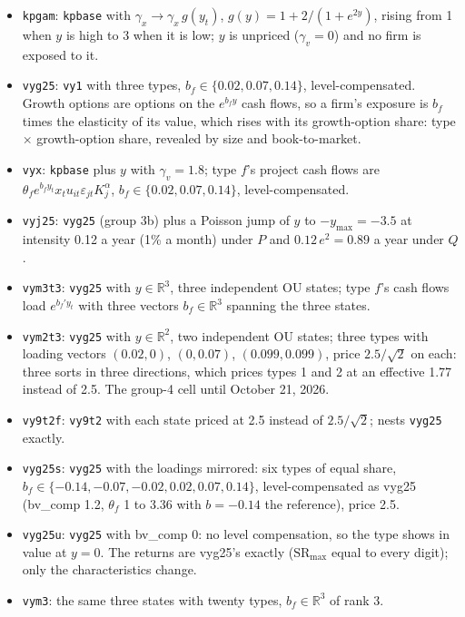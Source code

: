 \begin{itemize}
\item \texttt{kpgam}: \texttt{kpbase} with $\gamma_x\to\gamma_x\,g(y_t)$, $g(y)=1+2/(1+e^{2y})$, rising from 1 when $y$ is high to 3 when it is low; $y$ is unpriced ($\gamma_v=0$) and no firm is exposed to it.
\item \texttt{vyg25}: \texttt{vy1} with three types, $b_f\in\{0.02,0.07,0.14\}$, level-compensated. Growth options are options on the $e^{b_f y}$ cash flows, so a firm's exposure is $b_f$ times the elasticity of its value, which rises with its growth-option share: type $\times$ growth-option share, revealed by size and book-to-market.
\item \texttt{vyx}: \texttt{kpbase} plus $y$ with $\gamma_v=1.8$; type $f$'s project cash flows are $\theta_f e^{b_f y_t}x_t u_{it}\varepsilon_{jt}K_j^\alpha$, $b_f\in\{0.02,0.07,0.14\}$, level-compensated.
\item \texttt{vyj25}: \texttt{vyg25} (group 3b) plus a Poisson jump of $y$ to $-y_{\max}=-3.5$ at intensity 0.12 a year (1\% a month) under $P$ and $0.12\,e^{2}=0.89$ a year under $Q$.
\item \texttt{vym3t3}: \texttt{vyg25} with $y\in\mathbb{R}^3$, three independent OU states; type $f$'s cash flows load $e^{b_f'y_t}$ with three vectors $b_f\in\mathbb{R}^3$ spanning the three states.
\item \texttt{vym2t3}: \texttt{vyg25} with $y\in\mathbb{R}^2$, two independent OU states; three types with loading vectors $(0.02,0)$, $(0,0.07)$, $(0.099,0.099)$, price $2.5/\sqrt2$ on each: three sorts in three directions, which prices types 1 and 2 at an effective 1.77 instead of 2.5. The group-4 cell until October 21, 2026.
\item \texttt{vy9t2f}: \texttt{vy9t2} with each state priced at 2.5 instead of $2.5/\sqrt2$; nests \texttt{vyg25} exactly.
\item \texttt{vyg25s}: \texttt{vyg25} with the loadings mirrored: six types of equal share, $b_f\in\{-0.14,-0.07,-0.02,0.02,0.07,0.14\}$, level-compensated as vyg25 (bv\_comp 1.2, $\theta_f$ 1 to 3.36 with $b=-0.14$ the reference), price 2.5.
\item \texttt{vyg25u}: \texttt{vyg25} with bv\_comp 0: no level compensation, so the type shows in value at $y=0$. The returns are vyg25's exactly ($\mathrm{SR}_{\max}$ equal to every digit); only the characteristics change.
\item \texttt{vym3}: the same three states with twenty types, $b_f\in\mathbb{R}^3$ of rank 3.

\end{itemize}
